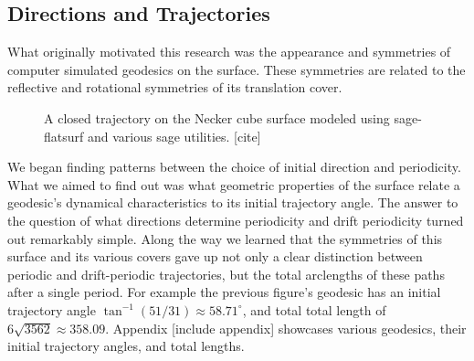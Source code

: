 \documentclass[a4paper, 11pt]{article}
\begin{document}
\subsection{Directions and Trajectories}
What originally motivated this research was the appearance and symmetries of computer simulated geodesics on the surface. These symmetries are related to the reflective and rotational symmetries of its translation cover.
\begin{figure}[H]
\centering

\caption{A closed trajectory on the Necker cube surface modeled using sage-flatsurf \cite{flatsurf} and various sage utilities. [cite]}
\end{figure}
We began finding patterns between the choice of initial direction and periodicity. What we aimed to find out was what geometric properties of the surface relate a geodesic's dynamical characteristics to its initial trajectory angle. The answer to the question of what directions determine periodicity and drift periodicity turned out remarkably simple. Along the way we learned that the symmetries of this surface and its various covers gave up not only a clear distinction between periodic and drift-periodic trajectories, but the total arclengths of these paths after a single period. For example the previous figure's geodesic has an initial trajectory angle $\tan^{-1}(51/31)\approx58.71^\circ$, and total total length of $6\sqrt{3562}\approx 358.09$. Appendix [include appendix] showcases various geodesics, their initial trajectory angles, and total lengths. 
\end{document}
